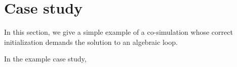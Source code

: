 \section{Case study}


In this section, we give a simple example of a co-simulation whose correct initialization demands the solution to an algebraic loop.

In the example case study, 